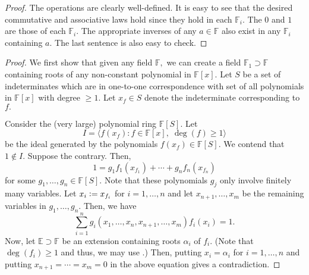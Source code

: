 \unionoffields*\label{lem:unionoffields2}
\begin{flushright}\hyperref[lem:unionoffields]{\upsym}\end{flushright}
\begin{proof}
    The operations are clearly well-defined. It is easy to see that the desired commutative and associative laws hold since they hold in each $\mathbb{F}_i.$ The $0$ and $1$ are those of each $\mathbb{F}_i.$ The appropriate inverses of any $a \in \mathbb{F}$ also exist in any $\mathbb{F}_i$ containing $a.$ The last sentence is also easy to check.
\end{proof}
\algclosedext*\label{thm:algclosedext2}
\begin{flushright}\hyperref[thm:algclosedext]{\upsym}\end{flushright}
\begin{proof}
    We first show that given any field $\mathbb{F},$ we can create a field $\mathbb{F}_1 \supset \mathbb{F}$ containing roots of any non-constant polynomial in $\mathbb{F}[x].$ Let $S$ be a set of indeterminates which are in one-to-one correspondence with set of all polynomials in $\mathbb{F}[x]$ with degree $\ge 1.$ Let $x_f \in S$ denote the indeterminate corresponding to $f.$

    Consider the (very large) polynomial ring $\mathbb{F}[S].$ Let 
    \begin{equation*} 
        I = \langle f(x_f)  : f \in \mathbb{F}[x],\;\deg(f) \ge 1\rangle
    \end{equation*}
    be the ideal generated by the polynomials $f(x_f) \in \mathbb{F}[S].$ We contend that $1 \notin I.$ Suppose the contrary. Then,
    \begin{equation*} 
        1 = g_1 f_1(x_{f_1}) + \cdots + g_n f_n(x_{f_n})
    \end{equation*}
    for some $g_1, \ldots, g_n \in \mathbb{F}[S].$ Note that these polynomials $g_j$ only involve finitely many variables. Let $x_i \vcentcolon= x_{f_i}$ for $i = 1, \ldots, n$ and let $x_{n + 1}, \ldots, x_m$ be the remaining variables in $g_1, \ldots, g_n.$ Then, we have
    \begin{equation*} 
        \sum_{i = 1}^{n} g_i(x_1, \ldots, x_n, x_{n + 1}, \ldots, x_m)f_i(x_i) = 1.
    \end{equation*}
    Now, let $\mathbb{E} \supset \mathbb{F}$ be an extension containing roots $\alpha_i$ of $f_i.$ (Note that $\deg(f_i) \ge 1$ and thus, we may use .) Then, putting $x_i = \alpha_i$ for $i = 1, \ldots, n$ and putting $x_{n + 1} = \cdots = x_m = 0$ in the above equation gives a contradiction.


\end{proof}
